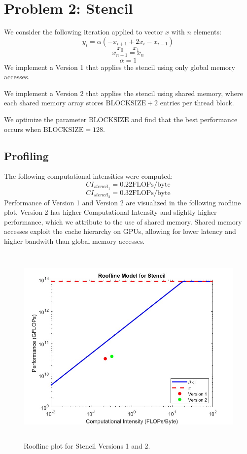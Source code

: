\documentclass{article}
\begin{document}
\section*{Problem 2: Stencil}
We consider the following iteration applied to vector $x$ with $n$ elements:
\[
y_i=\alpha(-x_{i+1}+2x_i-x_{i-1})
\]
\[
x_0=x_1
\]
\[
x_{n+1}=x_n
\]
\[
\alpha = 1
\]
We implement a Version 1 that applies the stencil using only global memory accesses.

We implement a Version 2 that applies the stencil using shared memory, where each shared memory array stores $\text{BLOCKSIZE}+2$ entries per thread block. 

We optimize the parameter $\text{BLOCKSIZE}$ and find that the best performance occurs when $\text{BLOCKSIZE} = 128$.

\subsection*{Profiling}
The following computational intensities were computed:
\[
CI_{stencil_1} = 0.22 \text{FLOPs/byte}
\]
\[
CI_{stencil_2} = 0.32 \text{FLOPs/byte}
\]
Performance of Version 1 and Version 2 are visualized in the following roofline plot. Version 2 has higher Computational Intensity and slightly higher performance, which we attribute to the use of shared memory. Shared memory accesses exploit the cache hierarchy on GPUs, allowing for lower latency and higher bandwith than global memory accesses.
\begin{figure}
    \centering
    \includegraphics[height=10cm]{roofline_stencil.jpg}
    \caption{Roofline plot for Stencil Versions 1 and 2.}
    \label{fig:enter-label}
\end{figure}
\FloatBarrier
\end{document}
